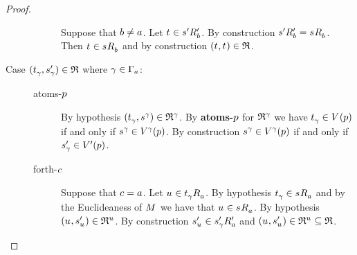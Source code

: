 \begin{proof}
\begin{description}
\begin{description}
                Suppose that $\agentB \neq \agentA$.
                Let $\kStateT \in \kSuccessorsPB{\kStateSP}$.
                By construction $\kSuccessorsPB{\kStateSP} = \kSuccessorsB{\kStateS}$.
                Then $\kStateT \in \kSuccessorsB{\kStateS}$ and by construction $(\kStateT, \kStateT) \in \refinement$.
        \end{description}
    \item[Case $(\kStateT_\gamma, \kStateSP_\gamma) \in \refinement$ where $\gamma \in \Gamma_\agentA$:]
        \hfill
        \begin{description}
            \item[atoms-$\atomP$] 
                By hypothesis $(\kStateT_\gamma, \kStateS[\gamma]) \in \refinement^\gamma$.
                By {\bf atoms-$\atomP$} for $\refinement^\gamma$ we have $\kStateT_\gamma \in \kValuation(\atomP)$ if and only if $\kStateS[\gamma] \in \kValuation[\gamma](\atomP)$.
                By construction $\kStateS[\gamma] \in \kValuation[\gamma](\atomP)$ if and only if $\kStateSP_\gamma \in \kValuationP(\atomP)$.
            \item[forth-$\agentC$]
                Suppose that $\agentC = \agentA$.
                Let $\kStateU \in \kSuccessorsA{\kStateT_\gamma}$.
                By hypothesis $\kStateT_\gamma \in \kSuccessorsA{\kStateS}$ and by the Euclideaness of $\kModel$ we have that $\kStateU \in \kSuccessorsA{\kStateS}$.
                By hypothesis $(\kStateU, \kStateSP_{\kStateU}) \in \refinement^{\kStateU}$.
                By construction $\kStateSP_{\kStateU} \in \kSuccessorsPA{\kStateSP_\gamma}$ and $(\kStateU, \kStateSP_{\kStateU}) \in \refinement^{\kStateU} \subseteq \refinement$.


\end{description}
\end{description}
\end{proof}
